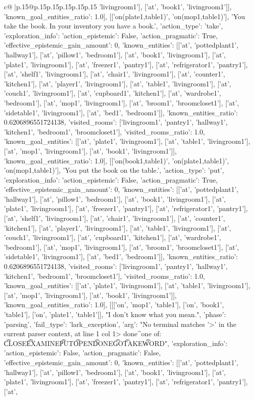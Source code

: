\documentclass{article}
\begin{document}
{\begin{supertabular}{c@{$\;$}|p{.15\linewidth}@{}p{.15\linewidth}p{.15\linewidth}p{.15\linewidth}p{.15\linewidth}p{.15\linewidth}}
{{{'livingroom1'], ['at', 'book1', 'livingroom1']], 'known_goal_entities_ratio': 1.0}}], [['on(plate1,table1)', 'on(mop1,table1)'], 'You take the book. In your inventory you have a book.', {'action_type': 'take', 'exploration_info': {'action_epistemic': False, 'action_pragmatic': True, 'effective_epistemic_gain_amount': 0, 'known_entities': [['at', 'pottedplant1', 'hallway1'], ['at', 'pillow1', 'bedroom1'], ['at', 'book1', 'livingroom1'], ['at', 'plate1', 'livingroom1'], ['at', 'freezer1', 'pantry1'], ['at', 'refrigerator1', 'pantry1'], ['at', 'shelf1', 'livingroom1'], ['at', 'chair1', 'livingroom1'], ['at', 'counter1', 'kitchen1'], ['at', 'player1', 'livingroom1'], ['at', 'table1', 'livingroom1'], ['at', 'couch1', 'livingroom1'], ['at', 'cupboard1', 'kitchen1'], ['at', 'wardrobe1', 'bedroom1'], ['at', 'mop1', 'livingroom1'], ['at', 'broom1', 'broomcloset1'], ['at', 'sidetable1', 'livingroom1'], ['at', 'bed1', 'bedroom1']], 'known_entities_ratio': 0.6206896551724138, 'visited_rooms': ['livingroom1', 'pantry1', 'hallway1', 'kitchen1', 'bedroom1', 'broomcloset1'], 'visited_rooms_ratio': 1.0, 'known_goal_entities': [['at', 'plate1', 'livingroom1'], ['at', 'table1', 'livingroom1'], ['at', 'mop1', 'livingroom1'], ['at', 'book1', 'livingroom1']], 'known_goal_entities_ratio': 1.0}}], [['on(book1,table1)', 'on(plate1,table1)', 'on(mop1,table1)'], 'You put the book on the table.', {'action_type': 'put', 'exploration_info': {'action_epistemic': False, 'action_pragmatic': True, 'effective_epistemic_gain_amount': 0, 'known_entities': [['at', 'pottedplant1', 'hallway1'], ['at', 'pillow1', 'bedroom1'], ['at', 'book1', 'livingroom1'], ['at', 'plate1', 'livingroom1'], ['at', 'freezer1', 'pantry1'], ['at', 'refrigerator1', 'pantry1'], ['at', 'shelf1', 'livingroom1'], ['at', 'chair1', 'livingroom1'], ['at', 'counter1', 'kitchen1'], ['at', 'player1', 'livingroom1'], ['at', 'table1', 'livingroom1'], ['at', 'couch1', 'livingroom1'], ['at', 'cupboard1', 'kitchen1'], ['at', 'wardrobe1', 'bedroom1'], ['at', 'mop1', 'livingroom1'], ['at', 'broom1', 'broomcloset1'], ['at', 'sidetable1', 'livingroom1'], ['at', 'bed1', 'bedroom1']], 'known_entities_ratio': 0.6206896551724138, 'visited_rooms': ['livingroom1', 'pantry1', 'hallway1', 'kitchen1', 'bedroom1', 'broomcloset1'], 'visited_rooms_ratio': 1.0, 'known_goal_entities': [['at', 'plate1', 'livingroom1'], ['at', 'table1', 'livingroom1'], ['at', 'mop1', 'livingroom1'], ['at', 'book1', 'livingroom1']], 'known_goal_entities_ratio': 1.0}}], [[['on', 'mop1', 'table1'], ['on', 'book1', 'table1'], ['on', 'plate1', 'table1']], "I don't know what you mean.", {'phase': 'parsing', 'fail_type': 'lark_exception', 'arg': "No terminal matches '>' in the current parser context, at line 1 col 1\n\n> done\n^\nExpected one of: \n\t* CLOSE\n\t* EXAMINE\n\t* PUT\n\t* OPEN\n\t* DONE\n\t* GO\n\t* TAKE\n\t* WORD\n", 'exploration_info': {'action_epistemic': False, 'action_pragmatic': False, 'effective_epistemic_gain_amount': 0, 'known_entities': [['at', 'pottedplant1', 'hallway1'], ['at', 'pillow1', 'bedroom1'], ['at', 'book1', 'livingroom1'], ['at', 'plate1', 'livingroom1'], ['at', 'freezer1', 'pantry1'], ['at', 'refrigerator1', 'pantry1'], ['at', }}}
\end{supertabular}}
\end{document}
